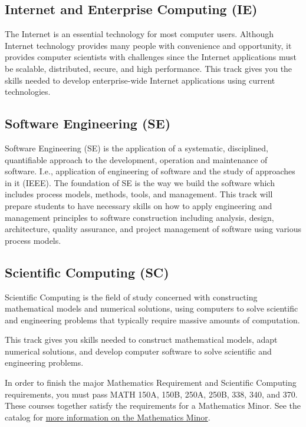 \documentclass{book}
\newcommand{\IeTrackName}{Internet and Enterprise Computing (IE)}
\newcommand{\SeTrackName}{Software Engineering (SE)}
\newcommand{\ScTrackName}{Scientific Computing (SC)}
\begin{document}
\subsection{\IeTrackName}
\IeTrackIndex
The Internet is an essential technology for most computer users. Although Internet technology provides many people with convenience and opportunity, it provides computer scientists with challenges since the Internet applications must be scalable, distributed, secure, and high performance. This track gives you the skills needed to develop enterprise-wide Internet applications using current technologies.

\subsection{\SeTrackName}
\SeTrackIndex
Software Engineering (SE) is the application of a systematic, disciplined, quantifiable approach to the development, operation and maintenance of software. I.e., application of engineering of software and the study of approaches in it (IEEE).  The foundation of SE is the way we build the software which includes process models, methods, tools, and management.  This track will prepare students to have necessary skills on how to apply engineering and management principles to software construction including analysis, design, architecture, quality assurance, and project management of software using various process models.

\subsection{\ScTrackName}
\ScTrackIndex

Scientific Computing is the field of study concerned with constructing mathematical models and numerical solutions, using computers to solve scientific and engineering problems that typically require massive amounts of computation.

This track gives you skills needed to construct mathematical models, adapt numerical solutions, and develop computer software to solve scientific and engineering problems.

In order to finish the major Mathematics Requirement and Scientific Computing requirements, you must pass MATH 150A, 150B, 250A, 250B, 338, 340, and 370. These courses together satisfy the requirements for a Mathematics Minor. See the catalog for \href{http://catalog.fullerton.edu/preview_program.php?catoid=2&poid=625}{more information on the Mathematics Minor}.
\end{document}
